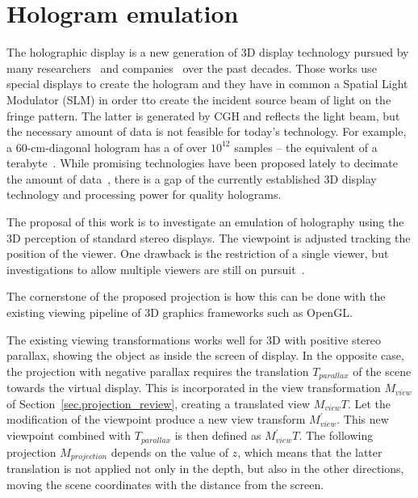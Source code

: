 \section {Hologram emulation}
\label{sec.hologram_emulation}

The holographic display is a new generation of 3D display technology pursued by many researchers~\cite{Lucente1992, Watlington1995, Lucente2012} and companies~\cite{schwerdtner2013} over the past decades. Those works use special displays to create the hologram and they have in common a Spatial Light Modulator (SLM) in order tto create the incident source beam of light on the fringe pattern. The latter is generated by CGH and reflects the light beam,  but the necessary amount of data is not feasible for today's technology. For example, a 60-cm-diagonal hologram has a of over $10^{12}$ samples – the equivalent of a terabyte~\cite{Lucente2012}. While promising technologies have been proposed lately to decimate the amount of data~\cite{Lucente1992, schwerdtner2013}, there is a gap of the currently established 3D display technology and processing power for quality holograms. 

The proposal of this work is to investigate an emulation of holography using the 3D perception of standard stereo displays. The viewpoint is adjusted tracking the position of the viewer. One drawback is the restriction of a single viewer, but investigations to allow multiple viewers are still on pursuit~\cite{Frohlich2005}.

The cornerstone of the proposed projection is how this can be done with the existing viewing pipeline of 3D graphics frameworks such as OpenGL. 

The existing viewing transformations works well for 3D with positive stereo parallax, showing the object as inside the screen of display. In the opposite case, the projection with negative parallax requires the translation $T_{parallax}$ of the scene towards the virtual display. This is incorporated in the view transformation $M_{view}$ of Section~\ref{sec.projection_review}, creating a translated view $M_{view}T$. Let the modification of the viewpoint produce a new view transform $M^{\prime}_{view}$. This new viewpoint combined with $T_{parallax}$ is then defined as $M^{\prime}_{view} T$. The following projection $M_{projection}$ depends on the value of $z$, which means that the latter translation is not applied not only in the depth, but also in the other directions, moving the scene coordinates with the distance from the screen. 

